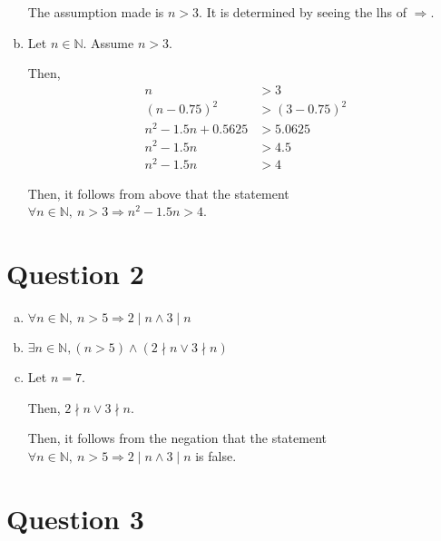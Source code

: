 \documentclass[12pt]{article}
\begin{document}
\begin{enumerate}[a.]
    The assumption made is $n > 3$. It is determined by seeing the lhs of
    $\Rightarrow$.

    \item

    Let $n \in \mathbb{N}$. Assume $n > 3$.

    \bigskip

    Then,
    \setcounter{equation}{0}
    \begin{align}
        n &> 3\\
        (n - 0.75)^2 &> (3 - 0.75)^2\\
        n^2 - 1.5n + 0.5625 &> 5.0625\\
        n^2 - 1.5n &> 4.5\\
        n^2 - 1.5n &> 4
    \end{align}

    \bigskip

    Then, it follows from above that the statement $\forall n \in \mathbb{N},\:
    n > 3 \Rightarrow n^2 - 1.5n > 4$.

\end{enumerate}

\section*{Question 2}
\begin{enumerate}[a.]
    \item

    $\forall n \in \mathbb{N},\:n > 5 \Rightarrow 2 \mid n \land 3 \mid n$

    \item

    $\exists n \in \mathbb{N}, (n > 5) \land (2 \nmid n \lor 3 \nmid n)$

    \item

    Let $n = 7$.

    \bigskip

    Then, $2 \nmid n \lor 3 \nmid n$.

    \bigskip

    Then, it follows from the negation that the statement $\forall n \in \mathbb{N},\:
    n >5 \Rightarrow 2 \mid n \land 3 \mid n$ is false.
\end{enumerate}

\section*{Question 3}
\end{document}

